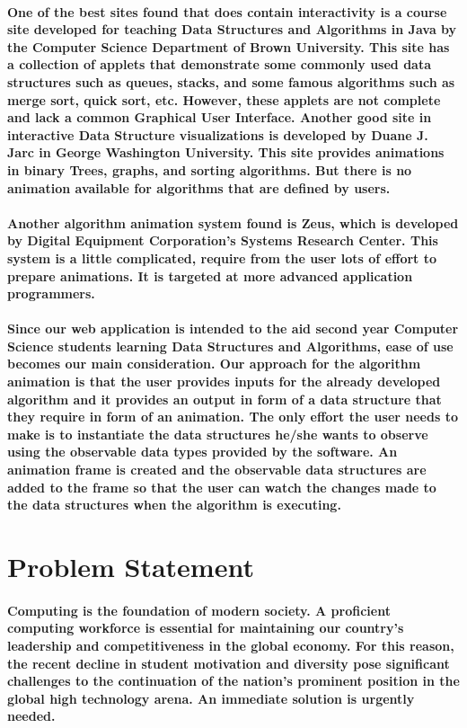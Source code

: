 \documentclass{article}
\begin{document}
\paragraph{One of the best sites found that does contain interactivity is a course site developed for teaching Data Structures and Algorithms in Java by the Computer Science Department of Brown University. This site has a collection of applets that demonstrate some commonly used data structures such as queues, stacks, and some famous algorithms such as merge sort, quick sort, etc. However, these applets are not complete and lack a common Graphical User Interface. Another good site in interactive Data Structure visualizations is developed by Duane J. Jarc in George Washington University\cite{jarc1998empirical}. This site provides animations in binary Trees, graphs, and sorting algorithms. But there is no animation available for algorithms that are defined by users.}
\paragraph{Another algorithm animation system found is Zeus, which is developed by Digital Equipment Corporation's Systems Research Center\cite{brown1993algorithm}. This system is a little complicated, require from the user lots of effort to prepare animations. It is targeted at more advanced application programmers.}
\paragraph{Since our web application is intended to the aid second year Computer Science students learning Data Structures and Algorithms, ease of use becomes our main consideration. Our approach for the algorithm animation is that the user provides inputs for the already developed algorithm and it provides an output in form of a data structure that they require in form of an animation. \cite{gupta2014introduction}The only effort the user needs to make is to instantiate the data structures he/she wants to observe using the observable data types provided by the software. An animation frame is created and the observable data structures are added to the frame so that the user can watch the changes made to the data structures when the algorithm is executing.}


\newpage
\section{Problem Statement}
\paragraph{Computing is the foundation of modern society. A proficient computing workforce is essential for maintaining our country's leadership and competitiveness in the global economy. For this reason, the recent decline in student motivation and diversity pose significant challenges to the continuation of the nation's prominent position in the global high technology arena. An immediate solution is urgently needed.}
\end{document}
